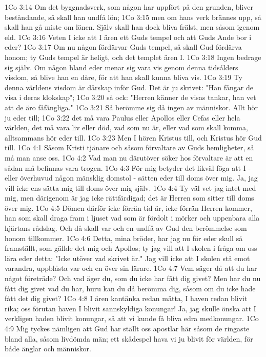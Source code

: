 1Co 3:14  Om det byggnadsverk, som någon har uppfört på den grunden, bliver beståndande, så skall han undfå lön;
1Co 3:15  men om hans verk brännes upp, så skall han gå miste om lönen. Själv skall han dock bliva frälst, men såsom igenom eld.
1Co 3:16  Veten I icke att I ären ett Guds tempel och att Guds Ande bor i eder?
1Co 3:17  Om nu någon fördärvar Guds tempel, så skall Gud fördärva honom; ty Guds tempel är heligt, och det templet ären I.
1Co 3:18  Ingen bedrage sig själv. Om någon bland eder menar sig vara vis genom denna tidsålders visdom, så blive han en dåre, för att han skall kunna bliva vis.
1Co 3:19  Ty denna världens visdom är dårskap inför Gud. Det är ju skrivet: "Han fångar de visa i deras klokskap";
1Co 3:20  så ock: "Herren känner de visas tankar, han vet att de äro fåfängliga."
1Co 3:21  Så berömme sig då ingen av människor. Allt hör ju eder till;
1Co 3:22  det må vara Paulus eller Apollos eller Cefas eller hela världen, det må vara liv eller död, vad som nu är, eller vad som skall komma, alltsammans hör eder till.
1Co 3:23  Men I hören Kristus till, och Kristus hör Gud till.
1Co 4:1  Såsom Kristi tjänare och såsom förvaltare av Guds hemligheter, så må man anse oss.
1Co 4:2  Vad man nu därutöver söker hos förvaltare är att en sådan må befinnas vara trogen.
1Co 4:3  För mig betyder det likväl föga att I - eller överhuvud någon mänsklig domstol - sätten eder till doms över mig. Ja, jag vill icke ens sätta mig till doms över mig själv.
1Co 4:4  Ty väl vet jag intet med mig, men därigenom är jag icke rättfärdigad; det är Herren som sitter till doms över mig.
1Co 4:5  Dömen därför icke förrän tid är, icke förrän Herren kommer, han som skall draga fram i ljuset vad som är fördolt i mörker och uppenbara alla hjärtans rådslag. Och då skall var och en undfå av Gud den berömmelse som honom tillkommer.
1Co 4:6  Detta, mina bröder, har jag nu för eder skull så framställt, som gällde det mig och Apollos; ty jag vill att I skolen i fråga om oss lära eder detta: "Icke utöver vad skrivet är." Jag vill icke att I skolen stå emot varandra, uppblåsta var och en över sin lärare.
1Co 4:7  Vem säger då att du har något företräde? Och vad äger du, som du icke har fått dig givet? Men har du nu fått dig givet vad du har, huru kan du då berömma dig, såsom om du icke hade fått det dig givet?
1Co 4:8  I ären kantänka redan mätta, I haven redan blivit rika; oss förutan haven I blivit sannskyldiga konungar! Ja, jag skulle önska att I verkligen haden blivit konungar, så att vi kunde få bliva edra medkonungar.
1Co 4:9  Mig tyckes nämligen att Gud har ställt oss apostlar här såsom de ringaste bland alla, såsom livdömda män; ett skådespel hava vi ju blivit för världen, för både änglar och människor.
